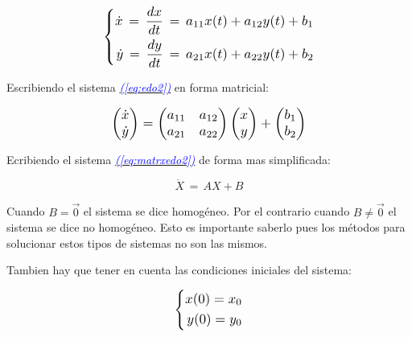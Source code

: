 \documentclass[12pt,a4paper]{report} %
\newcommand{\eref}[1]{\hyperref[#1]{\textcolor{blue}{\textit{(\ref*{#1})}}}}
\begin{document}
	\begin{equation}
		\label{eq:edo2}
		\scalebox{1.2}{$\displaystyle
			\left\{
			\begin{aligned}
				\dot{x}\,=\,\frac{dx}{dt}\,=\,a_{11}x(t)+a_{12}y(t)+b_1 \\
				\dot{y}\,=\,\frac{dy}{dt}\,=\,a_{21}x(t)+a_{22}y(t)+b_2
			\end{aligned}
			\right.
			$}
	\end{equation}\smallskip
	
	Escribiendo el sistema \eref{eq:edo2} en forma matricial:
	
	\begin{equation}
		\label{eq:matrxedo2}
		\scalebox{1.2}{$\displaystyle
		\begin{pmatrix}
			\dot{x}\\
			\dot{y}\\
		\end{pmatrix} =
		\begin{pmatrix}
			a_{11} & a_{12}\\
		    a_{21} & a_{22}\\
		\end{pmatrix} 
		\begin{pmatrix}
			x\\
			y\\
		\end{pmatrix} + 
		\begin{pmatrix}
			b_1\\
			b_2\\
		\end{pmatrix}
		$}
	\end{equation} \smallskip
	
	Ecribiendo el sistema \eref{eq:matrxedo2} de forma mas simplificada:
	
	\begin{equation}
		\dot{X}\,=\,AX+B
	\end{equation}\smallskip
	
	Cuando $B=\vec{0}$ el sistema se dice homogéneo. Por el contrario cuando $B\neq\vec{0}$ el sistema se dice no homogéneo. Esto es importante saberlo pues los métodos para solucionar estos tipos de sistemas no son las mismos.
	
	Tambien hay que tener en cuenta las condiciones iniciales del sistema:
	
	\begin{equation}
		\label{eq:ci}
		\scalebox{1.2}{$\displaystyle
			\left\{
			\begin{aligned}
				x(0)=x_0 \\
			    y(0)=y_0
			\end{aligned}
			\right.
			$}
	\end{equation}\smallskip
	
\end{document}
